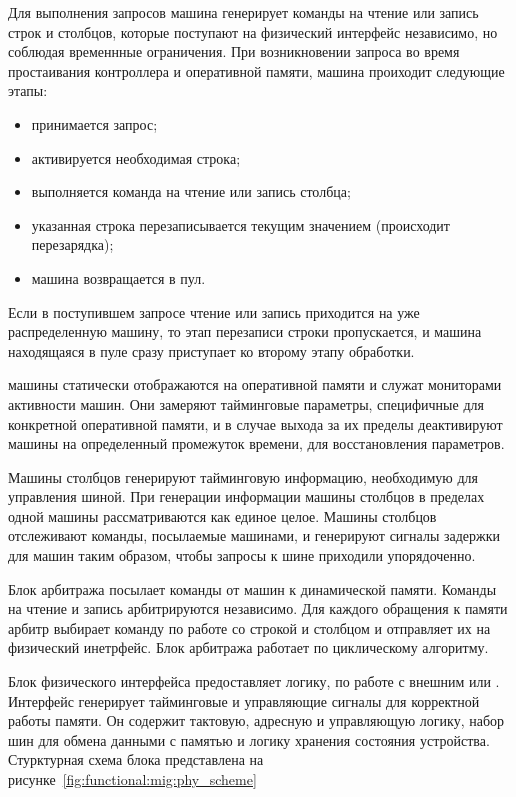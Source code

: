 Для выполнения запросов машина генерирует команды на чтение или запись строк и столбцов,
которые поступают на физический интерфейс независимо, но соблюдая временнные ограничения.
При возникновении запроса во время простаивания контроллера и оперативной памяти,
 машина проиходит следующие этапы:
\begin{itemize}
  \item принимается запрос;
  \item активируется необходимая строка;
  \item выполняется команда на чтение или запись столбца;
  \item указанная строка перезаписывается текущим значением (происходит перезарядка);
  \item машина возвращается в пул.
\end{itemize}

Если в поступившем запросе чтение или запись приходится на уже распределенную машину,
то этап перезаписи строки пропускается, и машина находящаяся в пуле сразу приступает
ко второму этапу обработки.

 машины статически отображаются на  оперативной памяти и служат
мониторами активности  машин. Они замеряют тайминговые параметры, специфичные
для конкретной оперативной памяти, и в случае выхода за их пределы деактивируют 
машины на определенный промежуток времени, для восстановления параметров.

Машины столбцов генерируют тайминговую информацию, необходимую для управления 
шиной. При генерации информации машины столбцов в пределах одной  машины
рассматриваются как единое целое. Машины столбцов отслеживают команды, посылаемые
 машинами, и генерируют сигналы задержки для  машин таким образом, чтобы запросы
к  шине приходили упорядоченно.

Блок арбитража посылает команды от  машин к динамической памяти. Команды на чтение и запись
арбитрируются независимо. Для каждого обращения к памяти арбитр выбирает команду по работе со строкой
и столбцом и отправляет их на физический инетрфейс. Блок арбитража работает по циклическому алгоритму.

Блок физического интерфейса предоставляет логику, по работе с внешним  или .
Интерфейс генерирует тайминговые и управляющие сигналы для корректной работы памяти. Он содержит
тактовую, адресную и управляющую логику, набор шин для обмена данными с памятью и логику хранения
состояния устройства. Стурктурная схема блока представлена на рисунке~\ref{fig:functional:mig:phy_scheme}

